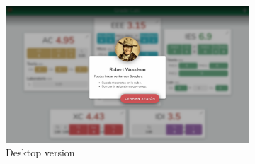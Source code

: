 \begin{figure}[ht!]
    \begin{subfigure}[b]{0.757\textwidth-0.1cm}
        \centering
        \includegraphics[width=\textwidth]{media/screenshots/screenshot-login-logout-pc.png}
        \caption{Desktop version}
    \end{subfigure}
    \hfill
    \begin{subfigure}[b]{0.243\textwidth-0.1cm}
        \centering

\end{subfigure}
\end{figure}
